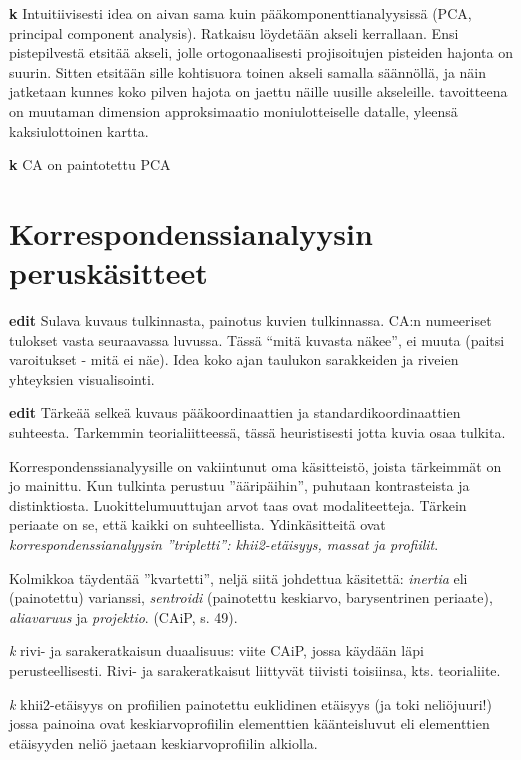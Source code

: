 \documentclass[
  finnish,
]{book}
\begin{document}
\textbf{k} Intuitiivisesti idea on aivan sama kuin pääkomponenttianalyysissä
(PCA, principal component analysis). Ratkaisu löydetään akseli kerrallaan.
Ensi pistepilvestä etsitää akseli, jolle ortogonaalisesti projisoitujen
pisteiden hajonta on suurin. Sitten etsitään sille kohtisuora toinen akseli
samalla säännöllä, ja näin jatketaan kunnes koko pilven hajota on jaettu näille
uusille akseleille. tavoitteena on muutaman dimension approksimaatio
moniulotteiselle datalle, yleensä kaksiulottoinen kartta.

\textbf{k} CA on paintotettu PCA

\hypertarget{korrespondenssianalyysin-peruskuxe4sitteet}{%
\section{Korrespondenssianalyysin peruskäsitteet}\label{korrespondenssianalyysin-peruskuxe4sitteet}}

\textbf{edit} Sulava kuvaus tulkinnasta, painotus kuvien tulkinnassa. CA:n numeeriset
tulokset vasta seuraavassa luvussa. Tässä ``mitä kuvasta näkee'', ei muuta (paitsi
varoitukset - mitä ei näe). Idea koko ajan taulukon sarakkeiden ja riveien yhteyksien
visualisointi.

\textbf{edit} Tärkeää selkeä kuvaus pääkoordinaattien ja standardikoordinaattien
suhteesta. Tarkemmin teorialiitteessä, tässä heuristisesti jotta kuvia osaa tulkita.

Korrespondenssianalyysille on vakiintunut oma käsitteistö, joista tärkeimmät on
jo mainittu. Kun tulkinta perustuu ''ääripäihin'', puhutaan kontrasteista ja
distinktiosta. Luokittelumuuttujan arvot taas ovat modaliteetteja.
Tärkein periaate on se, että kaikki on suhteellista. Ydinkäsitteitä ovat
\emph{korrespondenssianalyysin ''tripletti'': khii2-etäisyys, massat ja profiilit}.

Kolmikkoa täydentää ''kvartetti'', neljä siitä johdettua käsitettä: \emph{inertia} eli
(painotettu) varianssi, \emph{sentroidi} (painotettu keskiarvo, barysentrinen periaate),
\emph{aliavaruus} ja \emph{projektio}. (CAiP, s. 49).

\emph{k} rivi- ja sarakeratkaisun duaalisuus: viite CAiP, jossa käydään läpi
perusteellisesti. Rivi- ja sarakeratkaisut liittyvät tiivisti toisiinsa, kts.
teorialiite.

\emph{k} khii2-etäisyys on profiilien painotettu euklidinen etäisyys (ja toki
neliöjuuri!) jossa painoina ovat keskiarvoprofiilin elementtien käänteisluvut
eli elementtien etäisyyden neliö jaetaan keskiarvoprofiilin alkiolla.
\end{document}
